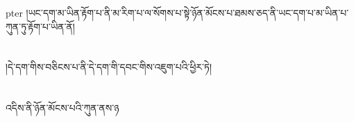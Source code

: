 pter{ }།ཡང་དག་མ་ཡིན་རྟོག་པ་ནི་མ་རིག་པ་ལ་སོགས་པ་སྟེ་ཉོན་མོངས་པ་ཐམས་ཅད་ནི་ཡང་དག་པ་མ་ཡིན་པ་ཀུན་ཏུ་རྟོག་པ་ཡིན་ནོ།\chapter{ }།དེ་དག་གིས་བཅིངས་པ་ནི་དེ་དག་གི་དབང་གིས་འཇུག་པའི་ཕྱིར་ཏེ།\chapter{ }འདིས་ནི་ཉོན་མོངས་པའི་ཀུན་ནས་ཉ